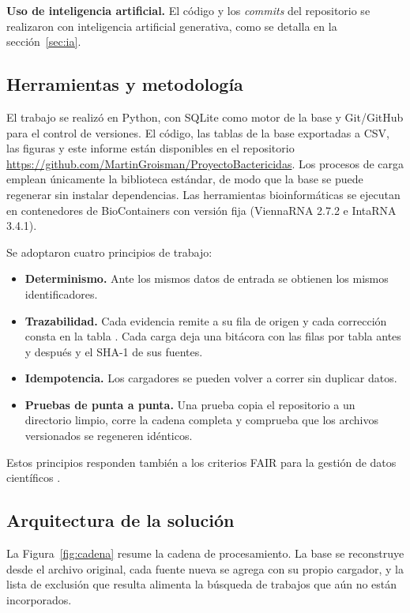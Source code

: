 \documentclass[11pt,a4paper]{article}
\newcommand{\repo}{\url{https://github.com/MartinGroisman/ProyectoBactericidas}}
\newcommand{\codigo}[1]{\texttt{\detokenize{#1}}}
\begin{document}
\textbf{Uso de inteligencia artificial.} El código y los \emph{commits} del repositorio se realizaron con inteligencia artificial generativa, como se detalla en la sección~\ref{sec:ia}.

\subsection{Herramientas y metodología}

El trabajo se realizó en Python, con SQLite como motor de la base y Git/GitHub para el control de versiones. El código, las tablas de la base exportadas a CSV, las figuras y este informe están disponibles en el repositorio \repo. Los procesos de carga emplean únicamente la biblioteca estándar, de modo que la base se puede regenerar sin instalar dependencias. Las herramientas bioinformáticas se ejecutan en contenedores de BioContainers con versión fija (ViennaRNA 2.7.2 e IntaRNA 3.4.1).

Se adoptaron cuatro principios de trabajo:
\begin{itemize}
  \item \textbf{Determinismo.} Ante los mismos datos de entrada se obtienen los mismos identificadores.
  \item \textbf{Trazabilidad.} Cada evidencia remite a su fila de origen y cada corrección consta en la tabla \codigo{qc_issue}. Cada carga deja una bitácora con las filas por tabla antes y después y el SHA-1 de sus fuentes.
  \item \textbf{Idempotencia.} Los cargadores se pueden volver a correr sin duplicar datos.
  \item \textbf{Pruebas de punta a punta.} Una prueba copia el repositorio a un directorio limpio, corre la cadena completa y comprueba que los archivos versionados se regeneren idénticos.
\end{itemize}
Estos principios responden también a los criterios FAIR para la gestión de datos científicos \cite{wilkinson2016}.

\subsection{Arquitectura de la solución}

La Figura~\ref{fig:cadena} resume la cadena de procesamiento. La base se reconstruye desde el archivo original, cada fuente nueva se agrega con su propio cargador, y la lista de exclusión que resulta alimenta la búsqueda de trabajos que aún no están incorporados.
\end{document}
